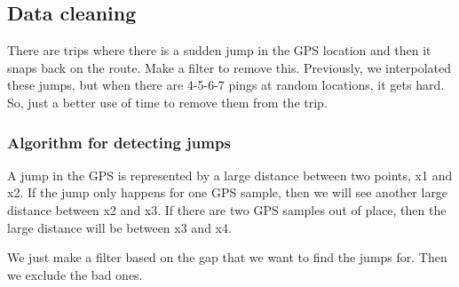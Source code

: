 \documentclass[]{article}
\begin{document}
\hypertarget{data-cleaning}{%
\subsection{Data cleaning}\label{data-cleaning}}

There are trips where there is a sudden jump in the GPS location and
then it snaps back on the route. Make a filter to remove this.
Previously, we interpolated these jumps, but when there are 4-5-6-7
pings at random locations, it gets hard. So, just a better use of time
to remove them from the trip.

\hypertarget{algorithm-for-detecting-jumps}{%
\subsubsection{Algorithm for detecting
jumps}\label{algorithm-for-detecting-jumps}}

A jump in the GPS is represented by a large distance between two points,
x1 and x2. If the jump only happens for one GPS sample, then we will see
another large distance between x2 and x3. If there are two GPS samples
out of place, then the large distance will be between x3 and x4.

We just make a filter based on the gap that we want to find the jumps
for. Then we exclude the bad ones.
\end{document}

